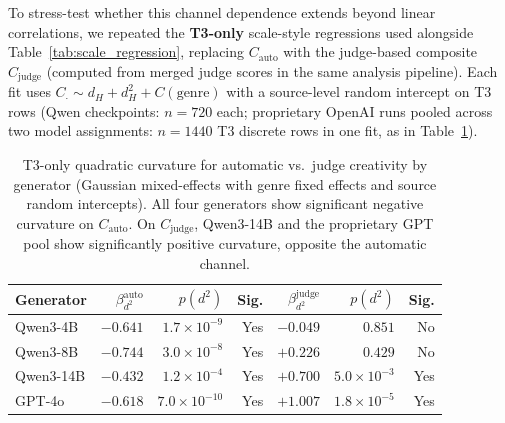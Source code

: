 \documentclass[sigconf,nonacm]{acmart}
\begin{document}
To stress-test whether this channel dependence extends beyond linear correlations, we repeated the \textbf{T3-only} scale-style regressions used alongside Table~\ref{tab:scale_regression}, replacing $C_{\mathrm{auto}}$ with the judge-based composite $C_{\mathrm{judge}}$ (computed from merged judge scores in the same analysis pipeline).
Each fit uses $C_{\cdot} \sim d_H + d_H^2 + C(\mathrm{genre})$ with a source-level random intercept on T3 rows (Qwen checkpoints: $n{=}720$ each; proprietary OpenAI runs pooled across two model assignments: $n{=}1440$ T3 discrete rows in one fit, as in Table~\ref{tab:judge_auto_divergence}).

\begin{table}[t]
\centering
\small
\begin{tabular}{lrrrrrr}
\toprule
Generator & $\beta_{d^2}^{\mathrm{auto}}$ & $p(d^2)$ & Sig. & $\beta_{d^2}^{\mathrm{judge}}$ & $p(d^2)$ & Sig. \\
\midrule
Qwen3-4B  & $-0.641$ & $1.7{\times}10^{-9}$ & Yes & $-0.049$ & $0.851$ & No \\
Qwen3-8B  & $-0.744$ & $3.0{\times}10^{-8}$ & Yes & $+0.226$ & $0.429$ & No \\
Qwen3-14B & $-0.432$ & $1.2{\times}10^{-4}$ & Yes & $+0.700$ & $5.0{\times}10^{-3}$ & Yes \\
GPT-4o    & $-0.618$ & $7.0{\times}10^{-10}$ & Yes & $+1.007$ & $1.8{\times}10^{-5}$ & Yes \\
\bottomrule
\end{tabular}
\caption{T3-only quadratic curvature for automatic vs.\ judge creativity by generator (Gaussian mixed-effects with genre fixed effects and source random intercepts). All four generators show significant negative curvature on $C_{\mathrm{auto}}$. On $C_{\mathrm{judge}}$, Qwen3-14B and the proprietary GPT pool show significantly positive curvature, opposite the automatic channel.}
\label{tab:judge_auto_divergence}
\end{table}
\end{document}
